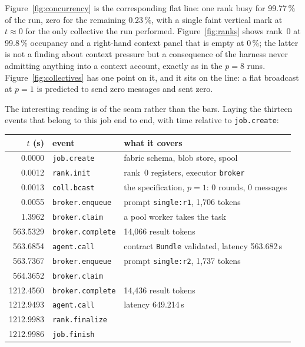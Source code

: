 \documentclass[11pt]{article}
\begin{document}
Figure~\ref{fig:concurrency} is the corresponding flat line: one rank busy for 99.77\,\% of
the run, zero for the remaining 0.23\,\%, with a single faint vertical mark at $t\approx0$ for
the only collective the run performed. Figure~\ref{fig:ranks} shows rank~0 at 99.8\,\%
occupancy and a right-hand context panel that is empty at 0\,\%; the latter is not a finding
about context pressure but a consequence of the harness never admitting anything into a
context account, exactly as in the $p=8$ runs. Figure~\ref{fig:collectives} has one point on
it, and it sits on the line: a flat broadcast at $p=1$ is predicted to send zero messages and
sent zero.

The interesting reading is of the seam rather than the bars. Laying the thirteen events that
belong to this job end to end, with time relative to \texttt{job.create}:

\begin{center}
\begin{tabular}{@{}rll@{}}
\toprule
$t$ (s) & event & what it covers \\
\midrule
0.0000 & \texttt{job.create} & fabric schema, blob store, spool \\
0.0012 & \texttt{rank.init} & rank~0 registers, executor \texttt{broker} \\
0.0013 & \texttt{coll.bcast} & the specification, $p=1$: 0 rounds, 0 messages \\
0.0055 & \texttt{broker.enqueue} & prompt \texttt{single:r1}, 1{,}706 tokens \\
1.3962 & \texttt{broker.claim} & a pool worker takes the task \\
563.5329 & \texttt{broker.complete} & 14{,}066 result tokens \\
563.6854 & \texttt{agent.call} & contract \texttt{Bundle} validated, latency 563.682\,s \\
563.7367 & \texttt{broker.enqueue} & prompt \texttt{single:r2}, 1{,}737 tokens \\
564.3652 & \texttt{broker.claim} & \\
1212.4560 & \texttt{broker.complete} & 14{,}436 result tokens \\
1212.9493 & \texttt{agent.call} & latency 649.214\,s \\
1212.9983 & \texttt{rank.finalize} & \\
1212.9986 & \texttt{job.finish} & \\
\bottomrule
\end{tabular}
\end{center}
\end{document}
